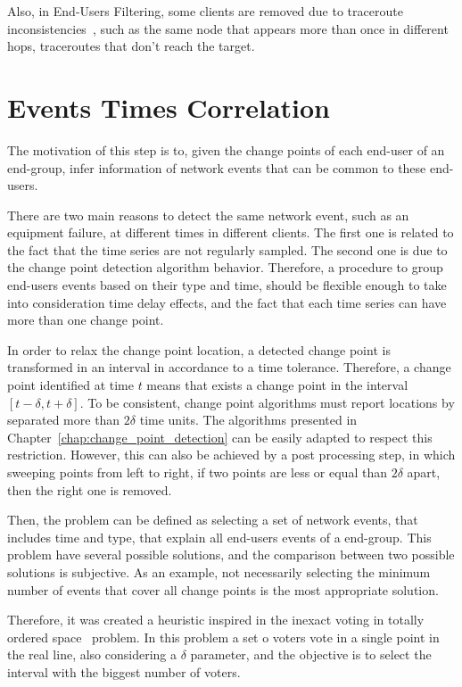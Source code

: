Also, in End-Users Filtering, some clients are removed due to traceroute
inconsistencies~\cite{avoiding_traceroute_anomalies_with_paris_traceroute},
such as the same node that appears more than once in different
hops, traceroutes that don't reach the target.

\section{Events Times Correlation}
\label{sec:events_times_correlation}

The motivation of this step is to, given the change points of each end-user of
an end-group, infer information of network events that can be common to these
end-users.

There are two main reasons to detect the same network event, such as an
equipment failure, at different times in different clients. The first one is
related to the fact that the time series are not regularly sampled. The second
one is due to the change point detection algorithm behavior.
Therefore, a procedure to group end-users events based on their type and time,
should be flexible enough to take into consideration time delay effects, and
the fact that each time series can have more than one change point.

In order to relax the change point location, a detected change point is
transformed in an interval in accordance to a time tolerance.
Therefore, a change point identified at
time $t$ means that exists a change point in the interval
$[t - \delta, t + \delta]$. To be consistent,
change point algorithms must report locations by separated more than
$2 \delta$ time units. The algorithms presented in
Chapter~\ref{chap:change_point_detection}
can be easily adapted to respect this restriction. However, this can also be
achieved by a post processing step, in which sweeping points from left to right,
if two
points are less or equal than $2 \delta$ apart, then the right one is removed.

Then, the problem can be defined as selecting a set of network events, that
includes time and type, that explain all end-users events of a end-group. This
problem have several possible solutions, and the comparison between two
possible solutions is subjective. As an example, not
necessarily selecting the minimum number of events that cover all change
points is the most appropriate solution.

Therefore, it was created a heuristic inspired in the inexact voting in totally
ordered space~\cite{voting_algorithms} problem. In this problem a set o voters
vote in a single point in the real line, also considering a $\delta$ parameter,
and the objective is to
select the interval with the biggest number of voters.

